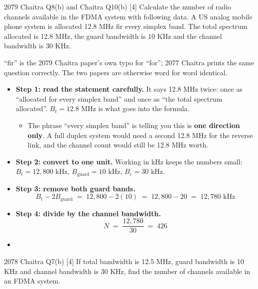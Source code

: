 \begin{asked}{2079 Chaitra \textperiodcentered{} Q8(b) \; and  Chaitra \textperiodcentered{} Q10(b) \textperiodcentered{} [4]}
Calculate the number of radio channels available in the FDMA system with following data. A US
analog mobile phone system is allocated 12.8 MHz fir every simplex band. The total spectrum
allocated is 12.8 MHz, the guard bandwidth is 10 KHz and the channel bandwidth is 30 KHz.
\par\vspace{1pt}
{\color{sub}``fir'' is the 2079 Chaitra paper's own typo for ``for''; 2077 Chaitra prints the
same question correctly. The two papers are otherwise word for word identical.}
\end{asked}

\begin{itemize}
  \item \textbf{Step 1: read the statement carefully.} It says 12.8 MHz twice: once as ``allocated
        for every simplex band'' and once as ``the total spectrum allocated''.  $B_t = 12.8$ MHz is what goes into the formula.
  \begin{itemize}
    \item The phrase ``every simplex band'' is telling you this is \textbf{one direction only}.
          A full duplex system would need a second 12.8 MHz for the reverse link, and the
          channel count would still be 12.8 MHz worth.
  \end{itemize}
  \item \textbf{Step 2: convert to one unit.} Working in kHz keeps the numbers small:
        $B_t = 12{,}800$ kHz, \; $B_{\text{guard}} = 10$ kHz, \; $B_c = 30$ kHz.
  \item \textbf{Step 3: remove both guard bands.}
        \[ B_t - 2B_{\text{guard}} \;=\; 12{,}800 - 2(10) \;=\; 12{,}800 - 20
           \;=\; 12{,}780 \text{ kHz} \]
  \item \textbf{Step 4: divide by the channel bandwidth.}
        \[ N \;=\; \frac{12{,}780}{30} \;=\; 426 \]
  \item {}
\end{itemize}

\begin{asked}{2078 Chaitra \textperiodcentered{} Q7(b) \textperiodcentered{} [4]}
If total bandwidth is 12.5 MHz, guard bandwidth is 10 KHz and channel bandwidth is 30 KHz,
find the number of channels available in an FDMA system.
\end{asked}

